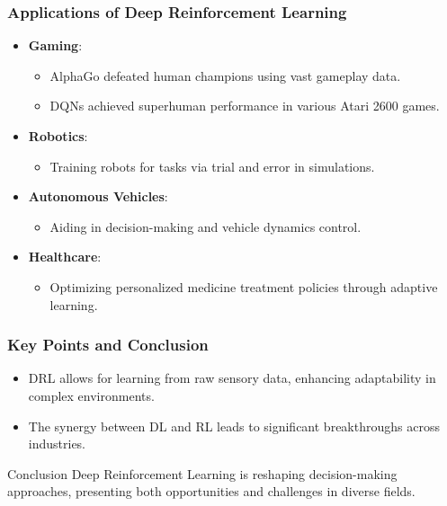 \documentclass[aspectratio=169]{beamer}
\begin{document}
\begin{frame}[fragile]
    \frametitle{Applications of Deep Reinforcement Learning}
    \begin{itemize}
        \item \textbf{Gaming}:
            \begin{itemize}
                \item AlphaGo defeated human champions using vast gameplay data.
                \item DQNs achieved superhuman performance in various Atari 2600 games.
            \end{itemize}
        \item \textbf{Robotics}:
            \begin{itemize}
                \item Training robots for tasks via trial and error in simulations.
            \end{itemize}
        \item \textbf{Autonomous Vehicles}:
            \begin{itemize}
                \item Aiding in decision-making and vehicle dynamics control.
            \end{itemize}
        \item \textbf{Healthcare}:
            \begin{itemize}
                \item Optimizing personalized medicine treatment policies through adaptive learning.
            \end{itemize}
    \end{itemize}
\end{frame}

\begin{frame}[fragile]
    \frametitle{Key Points and Conclusion}
    \begin{itemize}
        \item DRL allows for learning from raw sensory data, enhancing adaptability in complex environments.
        \item The synergy between DL and RL leads to significant breakthroughs across industries.
    \end{itemize}
    \begin{block}{Conclusion}
        Deep Reinforcement Learning is reshaping decision-making approaches, presenting both opportunities and challenges in diverse fields.
    \end{block}
\end{frame}
\end{document}
